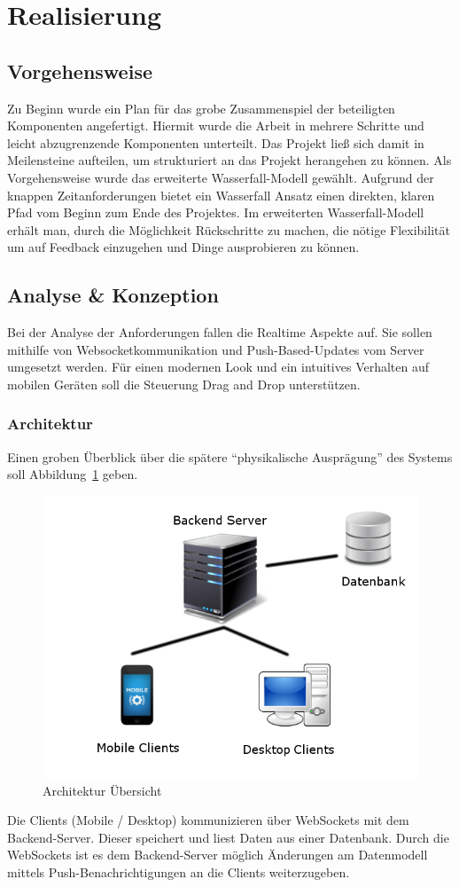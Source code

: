 \section{Realisierung}
\subsection{Vorgehensweise}
Zu Beginn wurde ein Plan für das grobe Zusammenspiel der beteiligten
Komponenten angefertigt. Hiermit wurde die Arbeit in mehrere Schritte
und leicht abzugrenzende Komponenten unterteilt. Das Projekt ließ sich
damit in Meilensteine aufteilen, um strukturiert an das Projekt
herangehen zu können. Als Vorgehensweise wurde das erweiterte
Wasserfall-Modell gewählt. Aufgrund der knappen Zeitanforderungen
bietet ein Wasserfall Ansatz einen direkten, klaren Pfad vom Beginn zum
Ende des Projektes. Im erweiterten Wasserfall-Modell erhält man, durch die
Möglichkeit Rückschritte zu machen, die nötige Flexibilität um auf
Feedback einzugehen und Dinge ausprobieren zu können.
\subsection{Analyse \& Konzeption}
Bei der Analyse der Anforderungen fallen die Realtime Aspekte auf. Sie
sollen mithilfe von Websocketkommunikation und Push-Based-Updates vom
Server umgesetzt werden. Für einen modernen Look und ein intuitives
Verhalten auf mobilen Geräten soll die Steuerung Drag and Drop unterstützen.
\subsubsection{Architektur}
Einen groben Überblick über die spätere ``physikalische Ausprägung''
des Systems soll Abbildung~\ref{fig:architektur} geben.
\begin{figure}[h]
\includegraphics[scale=0.5]{img/Architektur.png}
\caption{Architektur Übersicht\label{fig:architektur}}
\end{figure}
Die Clients (Mobile / Desktop) kommunizieren über WebSockets mit dem
Backend-Server. Dieser speichert und liest Daten aus einer Datenbank.
Durch die WebSockets ist es dem Backend-Server möglich Änderungen am
Datenmodell mittels Push-Benachrichtigungen an die Clients weiterzugeben.
